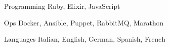

\begin{cvskills}

  \cvskill
    {Programming} %
    {Ruby, Elixir, JavaScript} %

  \cvskill
    {Ops} %
    {Docker, Ansible, Puppet, RabbitMQ, Marathon} %

  \cvskill
    {Languages} %
    {Italian, English, German, Spanish, French} %

\end{cvskills}
